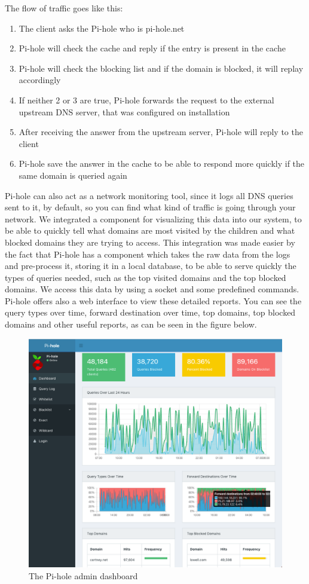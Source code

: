 The flow of traffic goes like this:
\begin{enumerate}
\item The client asks the Pi-hole who is pi-hole.net
\item Pi-hole will check the cache and reply if the entry is present in the cache
\item Pi-hole will check the blocking list and if the domain is blocked, it will replay accordingly
\item If neither 2 or 3 are true, Pi-hole forwards the request to the external upstream DNS server, that was configured on installation
\item After receiving the answer from the upstream server, Pi-hole will reply to the client
\item Pi-hole save the answer in the cache to be able to respond more quickly if the same domain is queried again
\end{enumerate}

Pi-hole can also act as a network monitoring tool, since it logs all DNS queries sent to it, by default, so you can find what kind of traffic is going through your network. We integrated a component for visualizing this data into our system, to be able to quickly tell what domains are most visited by the children and what blocked domains they are trying to access. This integration was made easier by the fact that Pi-hole has a component which takes the raw data from the logs and pre-process it, storing it in a local database, to be able to serve quickly the types of queries needed, such as the top visited domains and the top blocked domains. We access this data by using a socket and some predefined commands. Pi-hole offers also a web interface to view these detailed reports. You can see the query types over time, forward destination over time, top domains, top blocked domains and other useful reports, as can be seen in the figure below.

\begin{figure}[th]
\centering
\includegraphics[width=1\textwidth]{Figures/pihole-admin}
\decoRule
\caption{The Pi-hole admin dashboard}
\label{fig:pihole-admin}
\end{figure}

